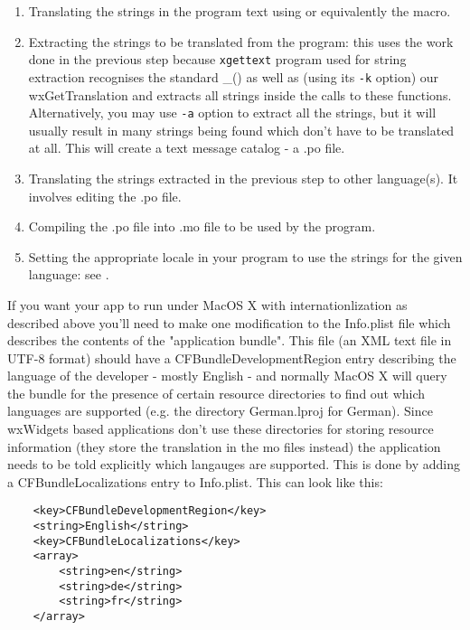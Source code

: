 \begin{enumerate}\itemsep=0pt
\item Translating the strings in the program text using 
 or equivalently the 
 macro.
\item Extracting the strings to be translated from the program: this uses the
work done in the previous step because {\tt xgettext} program used for string
extraction recognises the standard \_() as well as (using its {\tt -k} option)
our wxGetTranslation and extracts all strings inside the calls to these
functions. Alternatively, you may use {\tt -a} option to extract all the
strings, but it will usually result in many strings being found which don't
have to be translated at all. This will create a text message catalog - a .po
file.
\item Translating the strings extracted in the previous step to other
language(s). It involves editing the .po file.
\item Compiling the .po file into .mo file to be used by the program.
\item Setting the appropriate locale in your program to use the strings for the
given language: see .
\end{enumerate}

If you want your app to run under MacOS X with internationlization as
described above you'll need to make one modification to the Info.plist
file which describes the contents of the "application bundle". This
file (an XML text file in UTF-8 format) should have a
CFBundleDevelopmentRegion entry describing the language of the developer
- mostly English - and normally MacOS X will query the bundle for the
presence of certain resource directories to find out which languages
are supported (e.g. the directory German.lproj for German). 
Since wxWidgets based applications don't use these directories
for storing resource information (they store the translation in the
mo files instead) the application needs to be told explicitly which
langauges are supported. This is done by adding a CFBundleLocalizations
entry to Info.plist. This can look like this:

\begin{verbatim}
	<key>CFBundleDevelopmentRegion</key>
	<string>English</string>
	<key>CFBundleLocalizations</key>
	<array>
		<string>en</string>
		<string>de</string>
		<string>fr</string>
	</array>
\end{verbatim}


